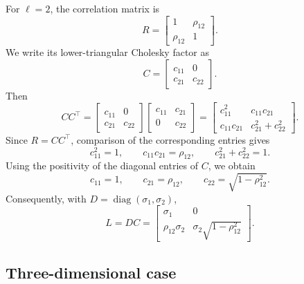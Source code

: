 For \(\ell=2\), the correlation matrix is
\[
R =
\begin{bmatrix}
1 & \rho_{12} \\
\rho_{12} & 1
\end{bmatrix}.
\]
We write its lower-triangular Cholesky factor as
\[
C =
\begin{bmatrix}
c_{11} & 0 \\
c_{21} & c_{22}
\end{bmatrix}.
\]
Then
\[
CC^\top
=
\begin{bmatrix}
c_{11} & 0 \\
c_{21} & c_{22}
\end{bmatrix}
\begin{bmatrix}
c_{11} & c_{21} \\
0 & c_{22}
\end{bmatrix}
=
\begin{bmatrix}
c_{11}^2 & c_{11}c_{21} \\
c_{11}c_{21} & c_{21}^2+c_{22}^2
\end{bmatrix}.
\]
Since \(R=CC^\top\), comparison of the corresponding entries gives
\[
c_{11}^2=1,
\qquad
c_{11}c_{21}=\rho_{12},
\qquad
c_{21}^2+c_{22}^2=1.
\]
Using the positivity of the diagonal entries of \(C\), we obtain
\[
c_{11}=1,
\qquad
c_{21}=\rho_{12},
\qquad
c_{22}=\sqrt{1-\rho_{12}^2}.
\]
Consequently, with \(D=\operatorname{diag}(\sigma_1,\sigma_2)\),
\[
L=DC
=
\begin{bmatrix}
\sigma_1 & 0 \\
\rho_{12}\sigma_2 &
\sigma_2\sqrt{1-\rho_{12}^2}
\end{bmatrix}.
\]

\subsection{Three-dimensional case}

